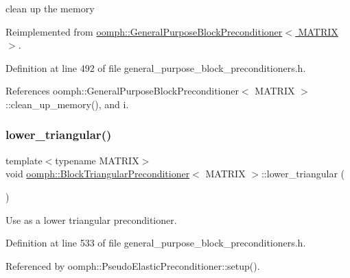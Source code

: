 clean up the memory 



Reimplemented from \hyperlink{classoomph_1_1GeneralPurposeBlockPreconditioner_a3272742d3c7f86327d33c5647af874e6}{oomph\+::\+General\+Purpose\+Block\+Preconditioner$<$ M\+A\+T\+R\+I\+X $>$}.



Definition at line 492 of file general\+\_\+purpose\+\_\+block\+\_\+preconditioners.\+h.



References oomph\+::\+General\+Purpose\+Block\+Preconditioner$<$ M\+A\+T\+R\+I\+X $>$\+::clean\+\_\+up\+\_\+memory(), and i.

\mbox{\label{classoomph_1_1BlockTriangularPreconditioner_aa87bdcf9f0cdcaa787786207bb6356b5}} 
\subsubsection{\texorpdfstring{lower\+\_\+triangular()}{lower\_triangular()}}
{\footnotesize\ttfamily template$<$typename M\+A\+T\+R\+IX$>$ \\
void \hyperlink{classoomph_1_1BlockTriangularPreconditioner}{oomph\+::\+Block\+Triangular\+Preconditioner}$<$ M\+A\+T\+R\+IX $>$\+::lower\+\_\+triangular (\begin{DoxyParamCaption}{ }\end{DoxyParamCaption})\hspace{0.3cm}{\ttfamily [inline]}}



Use as a lower triangular preconditioner. 



Definition at line 533 of file general\+\_\+purpose\+\_\+block\+\_\+preconditioners.\+h.



Referenced by oomph\+::\+Pseudo\+Elastic\+Preconditioner\+::setup().

\mbox{\label{classoomph_1_1BlockTriangularPreconditioner_a1b3c9fdcc5997c2f91668b2c1454ae59}} 
